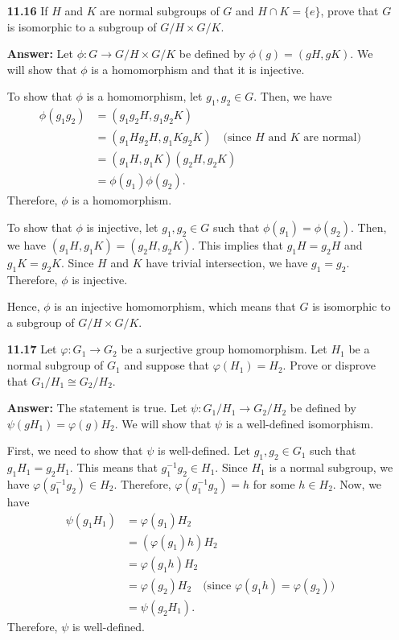 \documentclass[12pt,reqno]{amsart}
\newcommand{\<}{\ensuremath{\langle}}
\renewcommand{\>}{\ensuremath{\rangle}}
\begin{document}
\begin{enumerate}
\bigskip

\item[{\bf 11.16}]
If $H$ and $K$ are normal subgroups of $G$ and $H \cap K = \{ e \}$,
prove that $G$ is isomorphic to a subgroup of $G/H \times G/K$.

\textbf{Answer:} Let $\phi: G \rightarrow G/H \times G/K$ be defined by $\phi(g) = (gH, gK)$. We will show that $\phi$ is a homomorphism and that it is injective.

To show that $\phi$ is a homomorphism, let $g_1, g_2 \in G$. Then, we have
\begin{align*}
    \phi(g_1g_2) &= (g_1g_2H, g_1g_2K) \\
    &= (g_1Hg_2H, g_1Kg_2K) \quad \text{(since $H$ and $K$ are normal)} \\
    &= (g_1H, g_1K)(g_2H, g_2K) \\
    &= \phi(g_1)\phi(g_2).
\end{align*}
Therefore, $\phi$ is a homomorphism.

To show that $\phi$ is injective, let $g_1, g_2 \in G$ such that $\phi(g_1) = \phi(g_2)$. Then, we have $(g_1H, g_1K) = (g_2H, g_2K)$. This implies that $g_1H = g_2H$ and $g_1K = g_2K$. Since $H$ and $K$ have trivial intersection, we have $g_1 = g_2$. Therefore, $\phi$ is injective.

Hence, $\phi$ is an injective homomorphism, which means that $G$ is isomorphic to a subgroup of $G/H \times G/K$.

\bigskip

\newcommand\GHGK{\ensuremath{G/H \times G/K}}
\item[{\bf 11.17}]
Let $\varphi : G_1 \rightarrow G_2$ be a surjective group homomorphism.
Let $H_1$ be a normal subgroup of $G_1$ and suppose that $\varphi(H_1) =
H_2$.  Prove or disprove that $G_1/H_1 \cong G_2/H_2$.

\textbf{Answer:} The statement is true. Let $\psi: G_1/H_1 \rightarrow G_2/H_2$ be defined by $\psi(gH_1) = \varphi(g)H_2$. We will show that $\psi$ is a well-defined isomorphism.

First, we need to show that $\psi$ is well-defined. Let $g_1, g_2 \in G_1$ such that $g_1H_1 = g_2H_1$. This means that $g_1^{-1}g_2 \in H_1$. Since $H_1$ is a normal subgroup, we have $\varphi(g_1^{-1}g_2) \in H_2$. Therefore, $\varphi(g_1^{-1}g_2) = h$ for some $h \in H_2$. Now, we have
\begin{align*}
    \psi(g_1H_1) &= \varphi(g_1)H_2 \\
    &= (\varphi(g_1)h)H_2 \\
    &= \varphi(g_1h)H_2 \\
    &= \varphi(g_2)H_2 \quad \text{(since $\varphi(g_1h) = \varphi(g_2)$)} \\
    &= \psi(g_2H_1).
\end{align*}
Therefore, $\psi$ is well-defined.


\end{enumerate}
\end{document}
